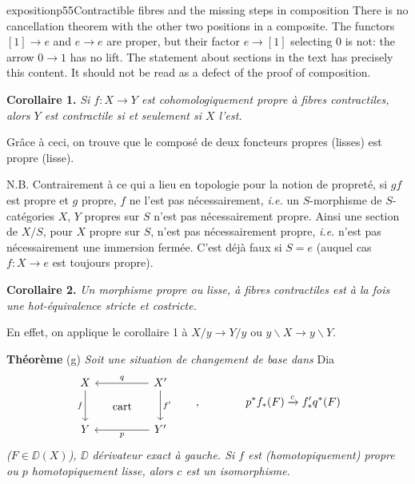 \begin{dcomment}{exposition}{p55}{Contractible fibres and the missing steps in composition}
There is no cancellation theorem with the other two positions in a composite. The functors $[1]\to e$ and $e\to e$ are proper, but their factor $e\to[1]$ selecting $0$ is not: the arrow $0\to1$ has no lift. The statement about sections in the text has precisely this content. It should not be read as a defect of the proof of composition.
\end{dcomment}


\noindent\textbf{Corollaire 1.} \textit{Si $f : X \to Y$ est cohomologiquement propre à fibres contractiles, alors $Y$ est contractile si et seulement si $X$ l'est.}

Grâce à ceci, on trouve que le composé de deux foncteurs propres (lisses) est propre (lisse).


\noindent N.B. Contrairement à ce qui a lieu en topologie pour la notion de propreté, si $gf$ est propre et $g$ propre, $f$ ne l'est pas nécessairement, \textit{i.e.} un $S$-morphisme de $S$-catégories $X$, $Y$ propres sur $S$ n'est pas nécessairement propre. Ainsi une section de $X/S$, pour $X$ propre sur $S$, n'est pas nécessairement propre, \textit{i.e.} n'est pas nécessairement une immersion fermée. C'est déjà faux si $S = e$ (auquel cas $f : X \to e$ est toujours propre).

\noindent\textbf{Corollaire 2.} \textit{Un morphisme propre ou lisse, à fibres contractiles est à la fois une hot-équivalence stricte et costricte.}

En effet, on applique le corollaire 1 à $X/y \to Y/y$ ou $y\backslash X \to y\backslash Y$.

\noindent\textbf{Théorème} (g) \textit{Soit une situation de changement de base dans} \textsf{Dia}
\[
\begin{tikzcd}[row sep=large, column sep=huge]
X \arrow[d, "f"'] \arrow[dr, phantom, "\text{cart}"] & X' \arrow[l, "q"'] \arrow[d, "f'"] \\
Y & Y' \arrow[l, "p"]
\end{tikzcd}
\qquad , \qquad\qquad p^*f_*(F) \xrightarrow{c} f'_*q^*(F)
\]
\textit{($F \in \DD(X)$), $\DD$ dérivateur exact à gauche. Si $f$ est (homotopiquement) propre ou $p$ homotopiquement lisse, alors $c$ est un isomorphisme.}

